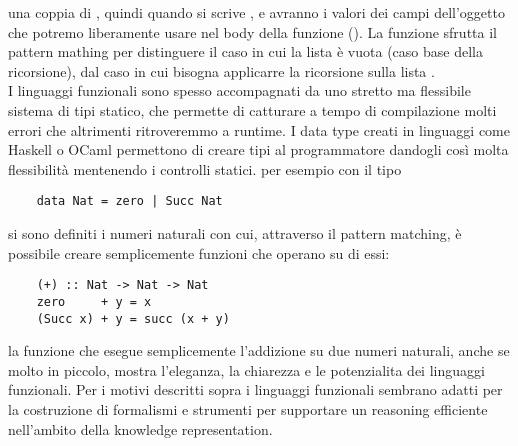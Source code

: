 una coppia di , quindi quando si scrive ,  e  avranno i valori dei campi dell'oggetto 
che potremo liberamente usare nel body della funzione ().
La funzione  sfrutta il pattern mathing per distinguere il caso in cui la lista è vuota  (caso base della ricorsione), dal caso in cui
bisogna applicarre la ricorsione sulla lista . 
\\I linguaggi funzionali sono spesso accompagnati da uno stretto ma flessibile sistema di tipi statico, che permette di catturare a tempo di compilazione molti errori che altrimenti ritroveremmo a runtime. I data type creati in linguaggi come Haskell \cite{...} o OCaml \cite{...}
permettono di creare tipi al programmatore dandogli così molta flessibilità mentenendo i controlli statici. per esempio con il tipo 
\begin{verbatim}
	data Nat = zero | Succ Nat
\end{verbatim}
si sono definiti i numeri naturali con cui, attraverso il pattern matching, è possibile creare semplicemente funzioni che operano su di essi:
\begin{verbatim}
	(+) :: Nat -> Nat -> Nat
	zero     + y = x
	(Succ x) + y = succ (x + y) 
\end{verbatim}
la funzione \code{(+)} che esegue semplicemente l'addizione su due numeri naturali, anche se molto in piccolo, mostra l'eleganza, la chiarezza e le potenzialita dei linguaggi funzionali.
Per i motivi descritti sopra i linguaggi funzionali sembrano adatti per la costruzione di formalismi e strumenti per supportare un reasoning efficiente
nell'ambito della knowledge representation.
